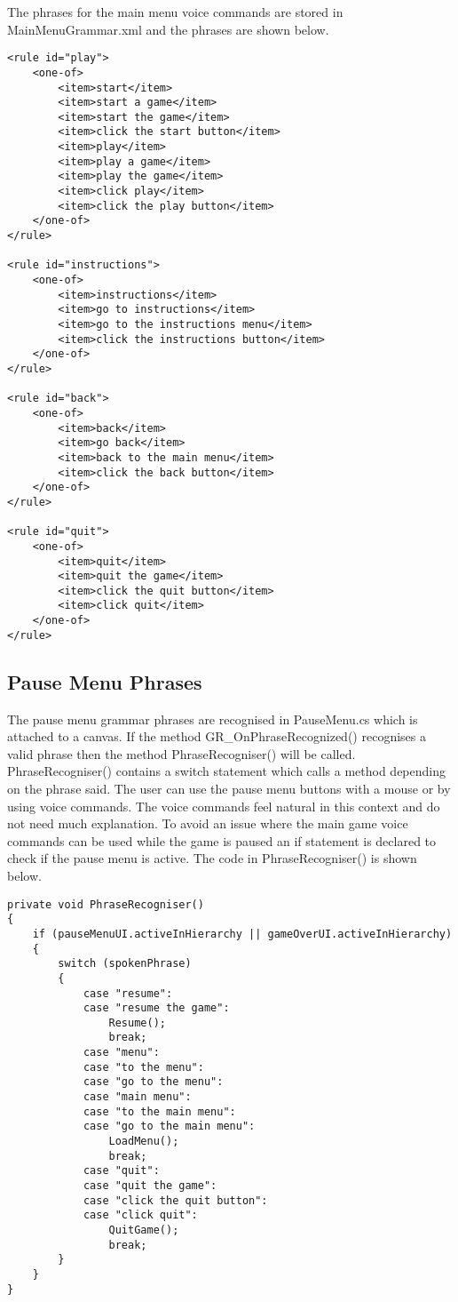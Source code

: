 \documentclass{article}
\begin{document}
The phrases for the main menu voice commands are stored in MainMenuGrammar.xml and the phrases are shown below.
\begin{verbatim}
<rule id="play">
    <one-of>
        <item>start</item>
        <item>start a game</item>
        <item>start the game</item>
        <item>click the start button</item>
        <item>play</item>
        <item>play a game</item>
        <item>play the game</item>
        <item>click play</item>
        <item>click the play button</item>
    </one-of>
</rule>

<rule id="instructions">
    <one-of>
        <item>instructions</item>
        <item>go to instructions</item>
        <item>go to the instructions menu</item>
        <item>click the instructions button</item>
    </one-of>
</rule>

<rule id="back">
    <one-of>
        <item>back</item>
        <item>go back</item>
        <item>back to the main menu</item>
        <item>click the back button</item>
    </one-of>
</rule>

<rule id="quit">
    <one-of>
        <item>quit</item>
        <item>quit the game</item>
        <item>click the quit button</item>
        <item>click quit</item>
    </one-of>
</rule>
\end{verbatim}

\subsection{Pause Menu Phrases}
The pause menu grammar phrases are recognised in PauseMenu.cs which is attached to a canvas. If the method GR\_OnPhraseRecognized() recognises a valid phrase then the method PhraseRecogniser() will be called. PhraseRecogniser() contains a switch statement which calls a method depending on the phrase said. The user can use the pause menu buttons with a mouse or by using voice commands. The voice commands feel natural in this context and do not need much explanation. To avoid an issue where the main game voice commands can be used while the game is paused an if statement is declared to check if the pause menu is active. The code in PhraseRecogniser() is shown below.
\begin{verbatim}
private void PhraseRecogniser()
{
    if (pauseMenuUI.activeInHierarchy || gameOverUI.activeInHierarchy)
    {
        switch (spokenPhrase)
        {
            case "resume":
            case "resume the game":
                Resume();
                break;
            case "menu":
            case "to the menu":
            case "go to the menu":
            case "main menu":
            case "to the main menu":
            case "go to the main menu":
                LoadMenu();
                break;
            case "quit":
            case "quit the game":
            case "click the quit button":
            case "click quit":
                QuitGame();
                break;
        }
    }
}
\end{verbatim}
\end{document}
